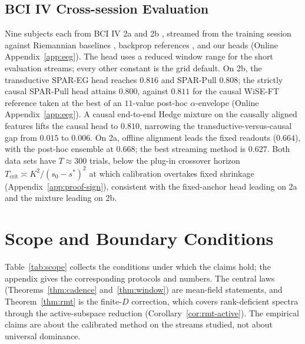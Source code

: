 \documentclass[twoside,11pt]{article}
\begin{document}
\subsection{BCI IV Cross-session Evaluation}
\label{sec:eeg}
Nine subjects each from BCI IV 2a \citep{brunner2008bci2a,tangermann2012bci} and 2b \citep{leeb2008bci2b}, streamed from the training session against Riemannian baselines \citep{barachant2012mdm,barachant2010riemannian}, backprop references \citep{lawhern2018eegnet}, and our heads (Online Appendix~\ref{app:eeg}).
The head uses a reduced window range for the short evaluation streams; every other constant is the grid default.
On 2b, the transductive SPAR-EG head reaches $0.816$ and SPAR-Pull $0.808$; the strictly causal SPAR-Pull head attains $0.800$, against $0.811$ for the causal WiSE-FT reference taken at the best of an $11$-value post-hoc $\alpha$-envelope (Online Appendix~\ref{app:eeg}). A causal end-to-end Hedge mixture on the causally aligned features lifts the causal head to $0.810$, narrowing the transductive-versus-causal gap from $0.015$ to $0.006$.
On 2a, offline alignment \citep{he2020ea} leads the fixed readouts ($0.664$), with the post-hoc ensemble at $0.668$; the best streaming method is $0.627$. Both data sets have $T \approx 300$ trials, below the plug-in crossover horizon $T_{\mathrm{crit}} \asymp K^2/(s_0 - s^*)^2$ at which calibration overtakes fixed shrinkage (Appendix~\ref{app:proof-sign}), consistent with the fixed-anchor head leading on 2a and the mixture leading on 2b.

\section{Scope and Boundary Conditions}
\label{sec:limitations}
Table~\ref{tab:scope} collects the conditions under which the claims hold; the appendix gives the corresponding protocols and numbers.
The central laws (Theorems~\ref{thm:cadence} and~\ref{thm:window}) are mean-field statements, and Theorem~\ref{thm:rmt} is the finite-$D$ correction, which covers rank-deficient spectra through the active-subspace reduction (Corollary~\ref{cor:rmt-active}).
The empirical claims are about the calibrated method on the streams studied, not about universal dominance.
\end{document}
